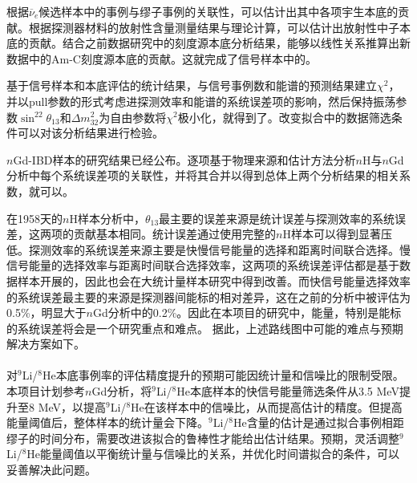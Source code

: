 \documentclass[a4paper,zihao=-4]{article}
\begin{document}
根据$\overline{\nu}_e$候选样本中的事例与缪子事例的关联性，可以估计出其中各项宇生本底的贡献。根据探测器材料的放射性含量测量结果与理论计算，可以估计出放射性中子本底的贡献。结合之前数据研究中的刻度源本底分析结果，能够以线性关系推算出新数据中的Am-C刻度源本底的贡献。这就完成了信号样本中的。

基于信号样本和本底评估的统计结果，与信号事例数和能谱的预测结果建立$\chi^2$，并以pull参数的形式考虑进探测效率和能谱的系统误差项的影响，然后保持振荡参数$\sin^22\theta_{13}$和$\Delta m_{32}^2$为自由参数将$\chi^2$极小化，就得到了。改变拟合中的数据筛选条件可以对该分析结果进行检验。

$n$Gd-IBD样本的研究结果已经公布。逐项基于物理来源和估计方法分析$n$H与$n$Gd分析中每个系统误差项的关联性，并将其合并以得到总体上两个分析结果的相关系数，就可以。

在1958天的$n$H样本分析中，$\theta_{13}$最主要的误差来源是统计误差与探测效率的系统误差，这两项的贡献基本相同。统计误差通过使用完整的$n$H样本可以得到显著压低。探测效率的系统误差来源主要是快慢信号能量的选择和距离时间联合选择。慢信号能量的选择效率与距离时间联合选择效率，这两项的系统误差评估都是基于数据样本开展的，因此也会在大统计量样本研究中得到改善。而快信号能量选择效率的系统误差最主要的来源是探测器间能标的相对差异，这在之前的分析中被评估为0.5\%，明显大于$n$Gd分析中的0.2\%。因此在本项目的研究中，能量，特别是能标的系统误差将会是一个研究重点和难点。
据此，上述路线图中可能的难点与预期解决方案如下。
\paragraph{}对$^9$Li/$^8$He本底事例率的评估精度提升的预期可能因统计量和信噪比的限制受限。本项目计划参考$n$Gd分析，将$^9$Li/$^8$He本底样本的快信号能量筛选条件从3.5 MeV提升至8 MeV，以提高$^9$Li/$^8$He在该样本中的信噪比，从而提高估计的精度。但提高能量阈值后，整体样本的统计量会下降。$^9$Li/$^8$He含量的估计是通过拟合事例相距缪子的时间分布，需要改进该拟合的鲁棒性才能给出估计结果。预期，灵活调整$^9$Li/$^8$He能量阈值以平衡统计量与信噪比的关系，并优化时间谱拟合的条件，可以妥善解决此问题。
\end{document}
